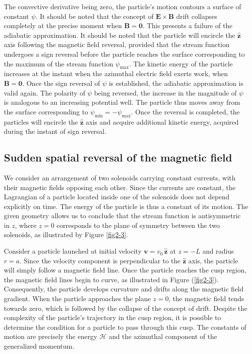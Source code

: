 The convective derivative being zero, the particle's motion contours a surface of constant $\psi$. It should be noted that the concept of $\mathbf{E}\times\mathbf{B}$ drift collapses completely at the precise moment when $\mathbf{B}=\mathbf{0}$. This presents a failure of the adiabatic approximation. It should be noted that the particle will encircle the $\mathbf{\hat{z}}$ axis following the magnetic field reversal, provided that the stream function undergoes a sign reversal before the particle reaches the surface corresponding to the maximum of the stream function $\psi_\text{max}$. The kinetic energy of the particle increases at the instant when the azimuthal electric field exerts work, when $\mathbf{B}=\mathbf{0}$. Once the sign reversal of $\psi$ is established, the adiabatic approximation is valid again. The polarity of $\psi$ being reversed, the increase in the magnitude of $\psi$ is analogous to an increasing potential well. The particle thus moves away from the surface corresponding to $\psi_\text{min}=-\psi_\text{max}$. Once the reversal is completed, the particles will encircle the $\mathbf{\hat{z}}$ axis and acquire additional kinetic energy, acquired during the instant of sign reversal.

\subsection{Sudden spatial reversal of the magnetic field}

\label{sec2-10-2-2}

We consider an arrangement of two solenoids carrying constant currents, with their magnetic fields opposing each other. Since the currents are constant, the Lagrangian of a particle located inside one of the solenoids does not depend explicitly on time. The energy of the particle is thus a constant of its motion. The given geometry allows us to conclude that the stream function is antisymmetric in $z$, where $z=0$ corresponds to the plane of symmetry between the two solenoids, as illustrated by Figure \ref{fig2-3}.

\quad Consider a particle launched at initial velocity $\mathbf{v}=v_0\,\mathbf{\hat{z}}$ at $z=-L$ and radius $r=a$. Since the velocity component is perpendicular to the $\mathbf{\hat{z}}$ axis, the particle will simply follow a magnetic field line. Once the particle reaches the cusp region, the magnetic field lines begin to curve, as illustrated in Figure (\ref{fig2-3}). Consequently, the particle develops curvature and drifts along the magnetic field gradient. When the particle approaches the plane $z=0$, the magnetic field tends towards zero, which is followed by the collapse of the concept of drift. Despite the complexity of the particle's trajectory in the cusp region, it is possible to determine the condition for a particle to pass through this cusp. The constants of motion are precisely the energy $\mathcal{H}$ and the azimuthal component of the generalized momentum.

